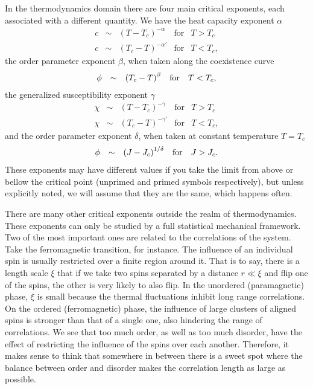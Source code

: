 In the thermodynamics domain there are four main critical exponents, each
associated with a different quantity. We have the heat capacity exponent
$\alpha$
\begin{equation}
    \label{eq:heatc}
    \begin{array}{ccccc}
        c & \sim & {\left(T-T_c\right)}^{-\alpha}  & \mbox{for} & T > T_c \\
        c & \sim & {\left(T_c-T\right)}^{-\alpha'} & \mbox{for} & T < T_c,
    \end{array}
\end{equation}
the order parameter exponent $\beta$, when taken along the coexistence curve 
\begin{equation}
    \begin{array}{ccccc}
        \phi  & \sim & {\left(T_c-T\right)}^{\beta} & \mbox{for} & T < T_c,
    \end{array}
\end{equation}
the generalized susceptibility exponent $\gamma$
\begin{equation}
    \begin{array}{ccccc}
        \chi  & \sim & {\left(T-T_c\right)}^{-\gamma}  & \mbox{for} & T > T_c \\
        \chi  & \sim & {\left(T_c-T\right)}^{-\gamma'} & \mbox{for} & T < T_c,
    \end{array}
\end{equation}
and the order parameter exponent $\delta$, when taken at constant temperature
$T=T_c$
\begin{equation}
    \begin{array}{ccccc}
        \phi  & \sim & {\left(J-J_c\right)}^{1/\delta} & \mbox{for} & J > J_c.
    \end{array}
\end{equation}
These exponents may have different values if you take the limit from above or
bellow the critical point (unprimed and primed symbols respectively), but
unless explicitly noted, we will assume that they are the same, which happens
often.

There are many other critical exponents outside the realm of thermodynamics.
These exponents can only be studied by a full statistical mechanical framework.
Two of the most important ones are related to the correlations of the system.
Take the ferromagnetic transition, for instance. The influence of an individual
spin is usually restricted over a finite region around it. That is to say,
there is a length scale $\xi$ that if we take two spins separated by a distance
$r\ll\xi$ and flip one of the spins, the other is very likely to also flip. In
the unordered (paramagnetic) phase, $\xi$ is small because the thermal
fluctuations inhibit long range correlations. On the ordered (ferromagnetic)
phase, the influence of large clusters of aligned spins is stronger than that
of a single one, also hindering the range of correlations. We see that too
much order, as well as too much disorder, have the effect of restricting the
influence of the spins over each another. Therefore, it makes sense to think
that somewhere in between there is a sweet spot where the balance between order
and disorder makes the correlation length as large as possible.


